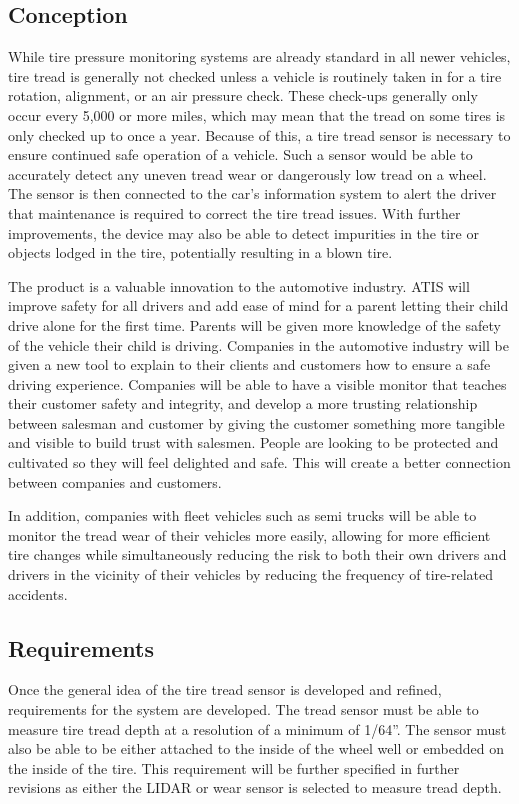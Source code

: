 \documentclass[11pt]{IEEEtran}
\begin{document}
		\subsection{Conception}
			While tire pressure monitoring systems are already standard in all newer vehicles, tire tread is generally not checked unless a vehicle is routinely taken in for a tire rotation, alignment, or an air pressure check. These check-ups generally only occur every 5,000 or more miles, which may mean that the tread on some tires is only checked up to once a year. Because of this, a tire tread sensor is necessary to ensure continued safe operation of a vehicle. Such a sensor would be able to accurately detect any uneven tread wear or dangerously low tread on a wheel. The sensor is then connected to the car’s information system to alert the driver that maintenance is required to correct the tire tread issues. With further improvements, the device may also be able to detect impurities in the tire or objects lodged in the tire, potentially resulting in a blown tire. 

			The product is a valuable innovation to the automotive industry. ATIS will improve safety for all  drivers and add ease of mind for a parent letting their child drive alone for the first time. Parents will be given more knowledge of the safety of the vehicle their child is driving. Companies in the automotive industry will be given a new tool to explain to their clients and customers how to ensure a safe driving experience. Companies will be able to have a visible monitor that teaches their customer safety and integrity, and develop a more trusting relationship between salesman and customer by giving the customer something more tangible and visible to build trust with salesmen. People are looking to be protected and cultivated so they will feel delighted and safe. This will create a better connection between companies and customers. 

			In addition, companies with fleet vehicles such as semi trucks will be able to monitor the tread wear of their vehicles more easily, allowing for more efficient tire changes while simultaneously reducing the risk to both their own drivers and drivers in the vicinity of their vehicles by reducing the frequency of tire-related accidents.

		\subsection{Requirements}
			Once the general idea of the tire tread sensor is developed and refined, requirements for the system are developed. The tread sensor must be able to measure tire tread depth at a resolution of a minimum of 1/64''. The sensor must also be able to be either attached to the inside of the wheel well or embedded on the inside of the tire. This requirement will be further specified in further revisions as either the LIDAR or wear sensor is selected to measure tread depth. 
\end{document}
